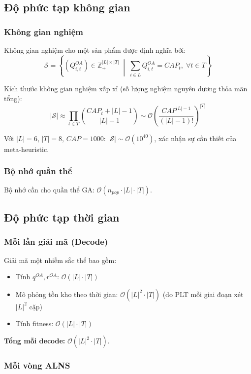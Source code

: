 \documentclass[12pt]{article}
\newcommand{\QOA}{Q^{OA}}
\newcommand{\qOA}{q^{OA}}
\newcommand{\rOA}{r^{OA}}
\begin{document}
\subsection{Độ phức tạp không gian}

\subsubsection*{Không gian nghiệm}

Không gian nghiệm cho một sản phẩm được định nghĩa bởi:
\[
\mathcal{S} = \left\{ (\QOA_{i,t}) \in \mathbb{Z}_+^{|L| \times |T|} \;\middle|\; \sum_{i \in L} \QOA_{i,t} = CAP_t, \; \forall t \in T \right\}
\]

Kích thước không gian nghiệm xấp xỉ (số lượng nghiệm nguyên dương thỏa mãn tổng):
\[
|\mathcal{S}| \approx \prod_{t \in T} \binom{CAP_t + |L| - 1}{|L| - 1} \sim \mathcal{O}\!\left(\frac{CAP^{|L|-1}}{(|L|-1)!}\right)^{|T|}
\]

Với $|L|=6$, $|T|=8$, $CAP=1000$: $|\mathcal{S}| \sim \mathcal{O}(10^{40})$, xác nhận sự cần thiết của meta-heuristic.

\subsubsection*{Bộ nhớ quần thể}

Bộ nhớ cần cho quần thể GA: $\mathcal{O}(n_{pop} \cdot |L| \cdot |T|)$.

\subsection{Độ phức tạp thời gian}

\subsubsection*{Mỗi lần giải mã (Decode)}

Giải mã một nhiễm sắc thể bao gồm:
\begin{itemize}
  \item Tính $\qOA, \rOA$: $\mathcal{O}(|L| \cdot |T|)$
  \item Mô phỏng tồn kho theo thời gian: $\mathcal{O}(|L|^2 \cdot |T|)$ (do PLT mỗi giai đoạn xét $|L|^2$ cặp)
  \item Tính fitness: $\mathcal{O}(|L| \cdot |T|)$
\end{itemize}

\textbf{Tổng mỗi decode:} $\mathcal{O}(|L|^2 \cdot |T|)$.

\subsubsection*{Mỗi vòng ALNS}
\end{document}
